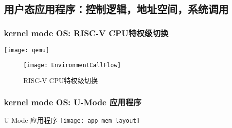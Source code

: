 


\subsection{用户态应用程序：控制逻辑，地址空间，系统调用}


\begin{frame}
	\frametitle{kernel mode OS: RISC-V CPU特权级切换}
	\centering
	\texttt{[image: qemu]}
	
%		
%
\begin{figure}
	\centering
    \texttt{[image: EnvironmentCallFlow]}
    	\caption{RISC-V CPU特权级切换}
    \end{figure}	
\end{frame}
\begin{frame}
    
    \frametitle{kernel mode OS: U-Mode 应用程序}
    U-Mode 应用程序
    \centering
    \texttt{[image: app-mem-layout]}
    
\end{frame}

